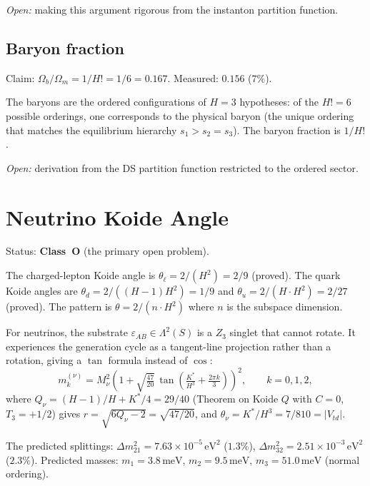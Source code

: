\documentclass[11pt,a4paper]{article}
\theoremstyle{definition}
\theoremstyle{remark}
\begin{document}
\emph{Open:} making this argument rigorous from the instanton partition function.

\subsection{Baryon fraction}\label{sec:omega_baryon}

Claim: $\Omega_b/\Omega_m = 1/H! = 1/6 = 0.167$. Measured: $0.156$ ($7\%$).

The baryons are the ordered configurations of $H = 3$ hypotheses: of the $H! = 6$ possible orderings, one corresponds to the physical baryon (the unique ordering that matches the equilibrium hierarchy $s_1 > s_2 = s_3$). The baryon fraction is $1/H!$.

\emph{Open:} derivation from the DS partition function restricted to the ordered sector.


\section{Neutrino Koide Angle}\label{sec:nu_koide}

Status: \textbf{Class~O} (the primary open problem).

The charged-lepton Koide angle is $\theta_\ell = 2/(H^2) = 2/9$ (proved). The quark Koide angles are $\theta_d = 2/((H-1)H^2) = 1/9$ and $\theta_u = 2/(H \cdot H^2) = 2/27$ (proved). The pattern is $\theta = 2/(n \cdot H^2)$ where $n$ is the subspace dimension.

For neutrinos, the substrate $\varepsilon_{AB}\in\Lambda^2(S)$ is a $Z_3$ singlet that cannot rotate. It experiences the generation cycle as a tangent-line projection rather than a rotation, giving a $\tan$ formula instead of $\cos$:
\begin{equation}\label{eq:nu_koide}
m_k^{(\nu)} = M_\nu^2\!\left(1+\sqrt{\tfrac{47}{20}}\,\tan\!\left(\tfrac{K^*}{H^3}+\tfrac{2\pi k}{3}\right)\right)^{\!2}, \qquad k=0,1,2,
\end{equation}
where $Q_\nu = (H-1)/H + K^*/4 = 29/40$ (Theorem on Koide $Q$ with $C=0$, $T_3=+1/2$) gives $r=\sqrt{6Q_\nu-2}=\sqrt{47/20}$, and $\theta_\nu = K^*/H^3 = 7/810 = |V_{td}|$.

The predicted splittings: $\Delta m^2_{21} = 7.63\times 10^{-5}\,\mathrm{eV}^2$ ($1.3\%$), $\Delta m^2_{32} = 2.51\times 10^{-3}\,\mathrm{eV}^2$ ($2.3\%$). Predicted masses: $m_1 = 3.8\,\mathrm{meV}$, $m_2 = 9.5\,\mathrm{meV}$, $m_3 = 51.0\,\mathrm{meV}$ (normal ordering).
\end{document}
